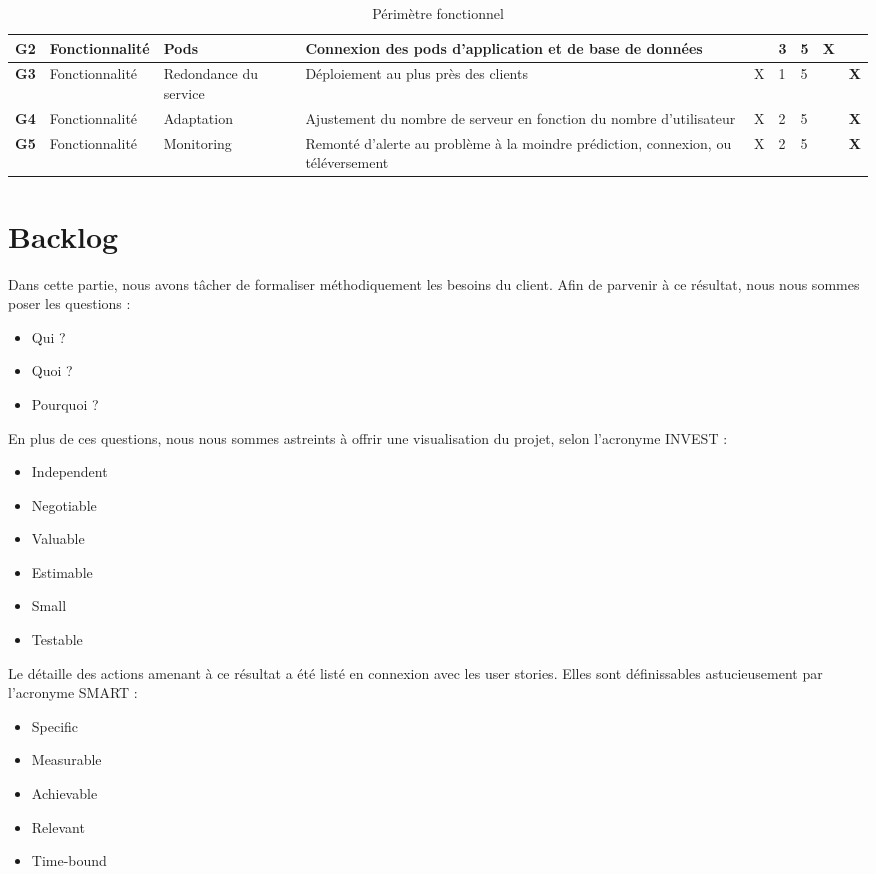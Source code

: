 \documentclass[12pt]{article}
\begin{document}
\begin{landscape}
\begin{table}[H]
{\begin{tabular}{p{1cm}p{2cm}p{3cm}p{10cm}p{1.75cm}p{1.5cm}p{1.25cm}p{.5cm}p{.5cm}}
\hline  	\bf G2& Fonctionnalité & Pods & Connexion des pods d’application et de base de données &  & 3 & 5 & \bf X &  \\
\hline  	\bf G3& Fonctionnalité & Redondance du service & Déploiement au plus près des clients & X & 1 & 5 &  & \bf X \\
\hline  	\bf G4& Fonctionnalité & Adaptation & Ajustement du nombre de serveur en fonction du nombre d’utilisateur & X & 2 & 5 & & \bf X \\
\hline  	\bf G5& Fonctionnalité & Monitoring & Remonté d’alerte au problème à la moindre prédiction, connexion, ou téléversement & X & 2 & 5 & & \bf X \\

\hline
\end{tabular}
}
\caption{Périmètre fonctionnel}
\label{functional_perimeter}
\end{table}
\end{landscape}




 


\section{Backlog}
Dans cette partie, nous avons tâcher de formaliser méthodiquement les besoins du client. Afin de parvenir à ce résultat, nous nous sommes poser les questions :
\begin{itemize}
	\item Qui ?
	\item Quoi ?
	\item Pourquoi ?
\end{itemize}

En plus de ces questions, nous nous sommes astreints à offrir une visualisation du projet, selon l’acronyme INVEST :
\begin{itemize}
	\item Independent
	\item Negotiable
	\item Valuable
	\item Estimable
	\item Small
	\item Testable
\end{itemize}

Le détaille des actions amenant à ce résultat a été listé en connexion avec les user stories. Elles sont définissables astucieusement par l’acronyme SMART :
\begin{itemize}
	\item Specific
	\item Measurable
	\item Achievable
	\item Relevant
	\item Time-bound
\end{itemize}
\end{document}
